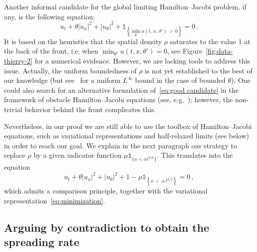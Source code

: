 \documentclass[10pt]{amsart}
\theoremstyle{definition}\newtheorem{defi}[theo]{Definition}\newtheorem{rema}[theo]{Remark}\newtheorem{exam}[theo]{Example}\newtheorem{exem}[theo]{Example}\newtheorem{nota}[theo]{Notation}
\newcommand{\1}{\mathds{1}}
\begin{document}
Another informal candidate for the global limiting Hamilton--Jacobi problem, if any, is the following equation:
\begin{equation}\label{eq:good candidate}
u_t+ \theta| u_{x}|^2+|u_{\theta}|^2+\1_{\left\{\min_{\theta'} u\left(t,\,x,\,\theta'\right)\,>\,0\right\}} = 0\,.
\end{equation}
It is based on the heuristics that the spatial density $\rho$ saturates to the value 1 at the back of the front, i.e. when $\min_{\theta'} u(t,x,\theta')=0$, see Figure~\ref{fig:data-thierry-2} for a numerical evidence. However, we are lacking tools to address this issue. Actually, the uniform boundedness of $\rho$ is not yet established to the best of our knowledge (but see~\cite{Turanova} for a uniform $L^\infty$ bound in the case of bounded $\theta$). One could also search for an alternative formulation of~\eqref{eq:good candidate} in the framework of obstacle Hamilton--Jacobi equations (see, e.g.~\cite{bouin_large_2016,EvansSouganidis}); however, the non-trivial behavior behind the front complicates this.



Nevertheless, in our proof we are still able to use the toolbox of Hamilton--Jacobi equations, such as variational representations and half-relaxed limits (see below) \cite{barles_discontinuous_1987} in order to reach our goal. We explain in the next paragraph our strategy to replace $\rho$ by a given indicator function $\mu \1_{\{ x < \alpha t^{3/2}\}}$. This translates into the equation
\[
u_t+ \theta| u_{x}|^2+|u_{\theta}|^2+1 - \mu \1_{\left\{x\,<\,\alpha\,t^{3/2}\right\}} = 0\,,
\]
which admits a comparison principle, together with the variational representation~\eqref{eq:minimization}.



\subsection*{Arguing by contradiction to obtain the spreading rate}
\end{document}
